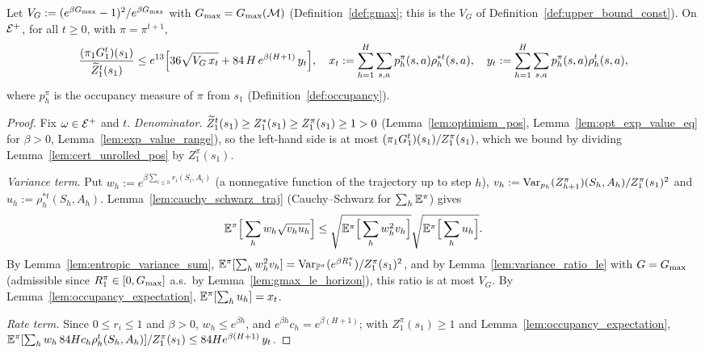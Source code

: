 \begin{lemma}\label{lem:ratio_bound_pos}
\leanok
{}
Let $V_G := (e^{\beta G_{\max}} - 1)^2/e^{\beta G_{\max}}$ with $G_{\max} = G_{\max}(\mathcal M)$ (Definition~\ref{def:gmax};
this is the $V_G$ of Definition~\ref{def:upper_bound_const}). On $\mathcal{E}^+$, for all $t \ge 0$, with
$\pi = \pi^{t+1}$,
\[
  \frac{(\pi_1G_1^t)(s_1)}{\widetilde{Z}_1^t(s_1)} \le e^{13}\Big[36\sqrt{V_G\,x_t} + 84\,H\,e^{\beta(H+1)}\,y_t\Big],
  \quad
  x_t := \sum_{h=1}^H\sum_{s,a} p^\pi_h(s,a)\rho^{*t}_h(s,a), \quad
  y_t := \sum_{h=1}^H\sum_{s,a} p^\pi_h(s,a)\rho^t_h(s,a),
\]
where $p^\pi_h$ is the occupancy measure of $\pi$ from $s_1$ (Definition~\ref{def:occupancy}).
\end{lemma}

\begin{proof}
\leanok
Fix $\omega \in \mathcal{E}^+$ and $t$. \emph{Denominator.} $\widetilde{Z}_1^t(s_1) \ge Z^*_1(s_1) \ge Z^\pi_1(s_1) \ge 1 > 0$
(Lemma~\ref{lem:optimism_pos}, Lemma~\ref{lem:opt_exp_value_eq} for $\beta > 0$,
Lemma~\ref{lem:exp_value_range}), so the left-hand side is at most $(\pi_1G_1^t)(s_1)/Z^\pi_1(s_1)$,
which we bound by dividing Lemma~\ref{lem:cert_unrolled_pos} by $Z^\pi_1(s_1)$.

\emph{Variance term.} Put $w_h := e^{\beta\sum_{i \le h} r_i(S_i,A_i)}$ (a nonnegative function of the
trajectory up to step $h$), $v_h := \operatorname{Var}_{p_h}(Z^\pi_{h+1})(S_h,A_h)/Z^\pi_1(s_1)^2$ and
$u_h := \rho^{*t}_h(S_h,A_h)$. Lemma~\ref{lem:cauchy_schwarz_traj} (Cauchy--Schwarz for $\sum_h\mathbb{E}^\pi$) gives
\[
  \mathbb{E}^\pi\Big[\sum_h w_h\sqrt{v_hu_h}\Big] \le \sqrt{\mathbb{E}^\pi\Big[\sum_h w_h^2v_h\Big]}\sqrt{\mathbb{E}^\pi\Big[\sum_h u_h\Big]} .
\]
By Lemma~\ref{lem:entropic_variance_sum},
$\mathbb{E}^\pi[\sum_h w_h^2 v_h] = \operatorname{Var}_{\mathbb{P}^\pi}(e^{\beta R_1^\pi})/Z^\pi_1(s_1)^2$, and by
Lemma~\ref{lem:variance_ratio_le} with $G = G_{\max}$ (admissible since $R_1^\pi \in [0, G_{\max}]$ a.s.\ by
Lemma~\ref{lem:gmax_le_horizon}), this ratio is at most $V_G$. By Lemma~\ref{lem:occupancy_expectation},
$\mathbb{E}^\pi[\sum_h u_h] = x_t$.

\emph{Rate term.} Since $0 \le r_i \le 1$ and $\beta > 0$, $w_h \le e^{\beta h}$, and $e^{\beta h}c_h = e^{\beta(H+1)}$;
with $Z^\pi_1(s_1) \ge 1$ and Lemma~\ref{lem:occupancy_expectation},
$\mathbb{E}^\pi[\sum_h w_h\,84Hc_h\rho^t_h(S_h,A_h)]/Z^\pi_1(s_1) \le 84He^{\beta(H+1)}\,y_t$.
\end{proof}

